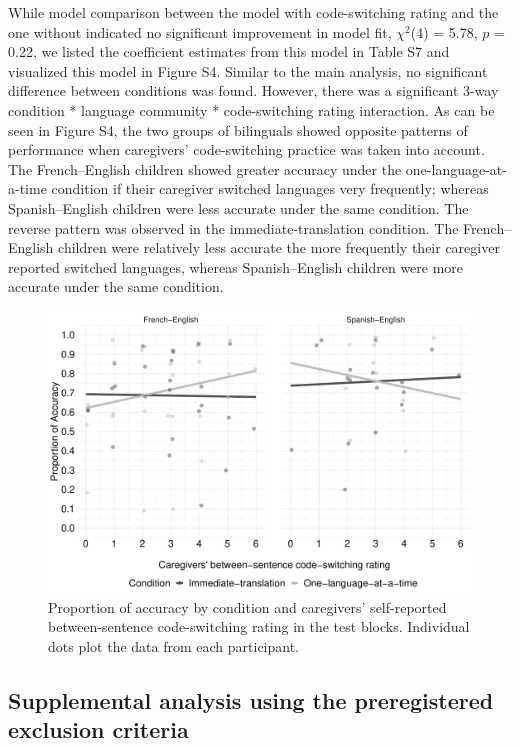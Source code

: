 \documentclass[
  man,floatsintext]{apa7}
\begin{document}
\noindent While model comparison between the model with code-switching rating and the one without indicated no significant improvement in model fit, \(\chi^2\)(4) = 5.78, \(p\) = 0.22, we listed the coefficient estimates from this model in Table S7 and visualized this model in Figure S4. Similar to the main analysis, no significant difference between conditions was found. However, there was a significant 3-way condition * language community * code-switching rating interaction. As can be seen in Figure S4, the two groups of bilinguals showed opposite patterns of performance when caregivers' code-switching practice was taken into account. The French--English children showed greater accuracy under the one-language-at-a-time condition if their caregiver switched languages very frequently; whereas Spanish--English children were less accurate under the same condition. The reverse pattern was observed in the immediate-translation condition. The French--English children were relatively less accurate the more frequently their caregiver reported switched languages, whereas Spanish--English children were more accurate under the same condition.

\begin{figure}

{\centering \includegraphics[width=0.9\linewidth]{TabletSwitch_supplemental_files/figure-latex/FigureS4-1} 

}

\caption{Proportion of accuracy by condition and caregivers’ self-reported between-sentence code-switching rating in the test blocks. Individual dots plot the data from each participant.}\label{fig:FigureS4}
\end{figure}

\hypertarget{supplemental-analysis-using-the-preregistered-exclusion-criteria}{%
\subsection{Supplemental analysis using the preregistered exclusion criteria}\label{supplemental-analysis-using-the-preregistered-exclusion-criteria}}
\end{document}
